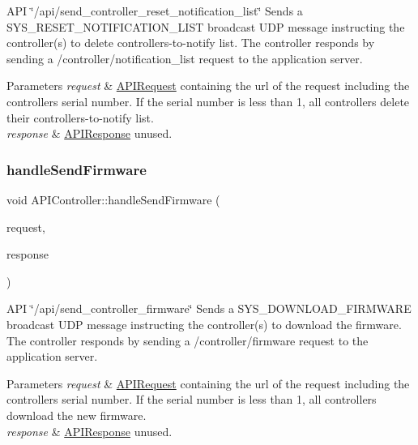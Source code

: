 A\+PI \char`\"{}/api/send\+\_\+controller\+\_\+reset\+\_\+notification\+\_\+list\char`\"{} Sends a S\+Y\+S\+\_\+\+R\+E\+S\+E\+T\+\_\+\+N\+O\+T\+I\+F\+I\+C\+A\+T\+I\+O\+N\+\_\+\+L\+I\+ST broadcast U\+DP message instructing the controller(s) to delete controllers-\/to-\/notify list. The controller responds by sending a /controller/notification\+\_\+list request to the application server. 
\begin{DoxyParams}{Parameters}
{\em request} & \hyperlink{class_a_p_i_request}{A\+P\+I\+Request} containing the url of the request including the controller\textquotesingle{}s serial number. If the serial number is less than 1, all controllers delete their controllers-\/to-\/notify list. \\
\hline
{\em response} & \hyperlink{class_a_p_i_response}{A\+P\+I\+Response} unused. \\
\hline
\end{DoxyParams}
\mbox{\label{class_a_p_i_controller_a2e140228ff2335d0d1a92d2353702c22}} 
\subsubsection{\texorpdfstring{handle\+Send\+Firmware}{handleSendFirmware}}
{\footnotesize\ttfamily void A\+P\+I\+Controller\+::handle\+Send\+Firmware (\begin{DoxyParamCaption}\item[{const \hyperlink{class_a_p_i_request}{A\+P\+I\+Request} \&}]{request,  }\item[{\hyperlink{class_a_p_i_response}{A\+P\+I\+Response} $\ast$}]{response }\end{DoxyParamCaption})\hspace{0.3cm}{\ttfamily [slot]}}

A\+PI \char`\"{}/api/send\+\_\+controller\+\_\+firmware\char`\"{} Sends a S\+Y\+S\+\_\+\+D\+O\+W\+N\+L\+O\+A\+D\+\_\+\+F\+I\+R\+M\+W\+A\+RE broadcast U\+DP message instructing the controller(s) to download the firmware. The controller responds by sending a /controller/firmware request to the application server. 
\begin{DoxyParams}{Parameters}
{\em request} & \hyperlink{class_a_p_i_request}{A\+P\+I\+Request} containing the url of the request including the controller\textquotesingle{}s serial number. If the serial number is less than 1, all controllers download the new firmware. \\
\hline
{\em response} & \hyperlink{class_a_p_i_response}{A\+P\+I\+Response} unused. \\
\hline
\end{DoxyParams}
\mbox{\label{class_a_p_i_controller_a37992872aeb294f51ca323cc25075f69}} 
